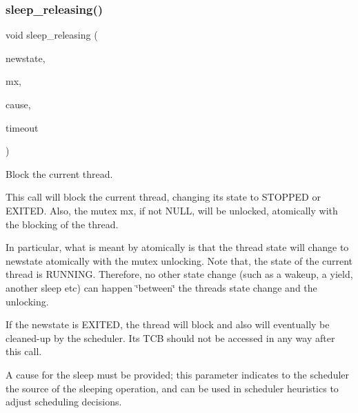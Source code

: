 \mbox{\label{group__scheduler_ga0ab1a2dcfbfe3fb09cc24044efddfd34}} 
\subsubsection{\texorpdfstring{sleep\+\_\+releasing()}{sleep\_releasing()}}
{\footnotesize\ttfamily void sleep\+\_\+releasing (\begin{DoxyParamCaption}\item[{\hyperlink{group__scheduler_ga6c969c169777f82c104cf73e501df70f}{Thread\+\_\+state}}]{newstate,  }\item[{\hyperlink{group__syscalls_gaef2ec62cae8e0031fd19fc8b91083ade}{Mutex} $\ast$}]{mx,  }\item[{enum \hyperlink{group__scheduler_gaad787d8d80312ffca3c0f197b3a25fbe}{S\+C\+H\+E\+D\+\_\+\+C\+A\+U\+SE}}]{cause,  }\item[{\hyperlink{bios_8h_ae7291e5cd742fb9bc6d4aaa0d51bd0ee}{Timer\+Duration}}]{timeout }\end{DoxyParamCaption})}



Block the current thread. 

This call will block the current thread, changing its state to {\ttfamily S\+T\+O\+P\+P\+ED} or {\ttfamily E\+X\+I\+T\+ED}. Also, the mutex {\ttfamily mx}, if not {\ttfamily N\+U\+LL}, will be unlocked, atomically with the blocking of the thread.

In particular, what is meant by \textquotesingle{}atomically\textquotesingle{} is that the thread state will change to {\ttfamily newstate} atomically with the mutex unlocking. Note that, the state of the current thread is {\ttfamily R\+U\+N\+N\+I\+NG}. Therefore, no other state change (such as a wakeup, a yield, another sleep etc) can happen \char`\"{}between\char`\"{} the thread\textquotesingle{}s state change and the unlocking.

If the {\ttfamily newstate} is {\ttfamily E\+X\+I\+T\+ED}, the thread will block and also will eventually be cleaned-\/up by the scheduler. Its T\+CB should not be accessed in any way after this call.

A cause for the sleep must be provided; this parameter indicates to the scheduler the source of the sleeping operation, and can be used in scheduler heuristics to adjust scheduling decisions.

